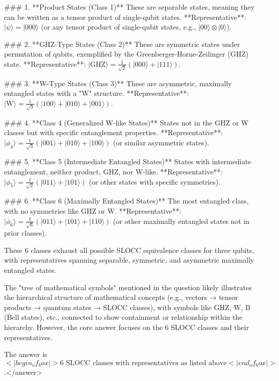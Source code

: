 ### 1. **Product States (Class 1)**  
These are separable states, meaning they can be written as a tensor product of single-qubit states.  
**Representative**: \( |\psi\rangle = |000\rangle \) (or any tensor product of single-qubit states, e.g., \( |00\rangle \otimes |0\rangle \)).  


### 2. **GHZ-Type States (Class 2)**  
These are symmetric states under permutation of qubits, exemplified by the Greenberger-Horne-Zeilinger (GHZ) state.  
**Representative**: \( |\text{GHZ}\rangle = \frac{1}{\sqrt{2}}(|000\rangle + |111\rangle) \).  


### 3. **W-Type States (Class 3)**  
These are asymmetric, maximally entangled states with a "W" structure.  
**Representative**: \( |\text{W}\rangle = \frac{1}{\sqrt{3}}(|100\rangle + |010\rangle + |001\rangle) \).  


### 4. **Class 4 (Generalized W-like States)**  
States not in the GHZ or W classes but with specific entanglement properties.  
**Representative**: \( |\phi_4\rangle = \frac{1}{\sqrt{3}}(|001\rangle + |010\rangle + |100\rangle) \) (or similar asymmetric states).  


### 5. **Class 5 (Intermediate Entangled States)**  
States with intermediate entanglement, neither product, GHZ, nor W-like.  
**Representative**: \( |\phi_5\rangle = \frac{1}{\sqrt{2}}(|011\rangle + |101\rangle) \) (or other states with specific symmetries).  


### 6. **Class 6 (Maximally Entangled States)**  
The most entangled class, with no symmetries like GHZ or W.  
**Representative**: \( |\phi_6\rangle = \frac{1}{\sqrt{6}}(|011\rangle + |101\rangle + |110\rangle) \) (or other maximally entangled states not in prior classes).  


These 6 classes exhaust all possible SLOCC equivalence classes for three qubits, with representatives spanning separable, symmetric, and asymmetric maximally entangled states.  

The "tree of mathematical symbols" mentioned in the question likely illustrates the hierarchical structure of mathematical concepts (e.g., vectors → tensor products → quantum states → SLOCC classes), with symbols like \( \text{GHZ} \), \( \text{W} \), \( \text{B} \) (Bell states), etc., connected to show containment or relationship within the hierarchy. However, the core answer focuses on the 6 SLOCC classes and their representatives.  

The answer is \(<|begin_of_box|>6 \text{ SLOCC classes with representatives as listed above}<|end_of_box|>\).</answer>
